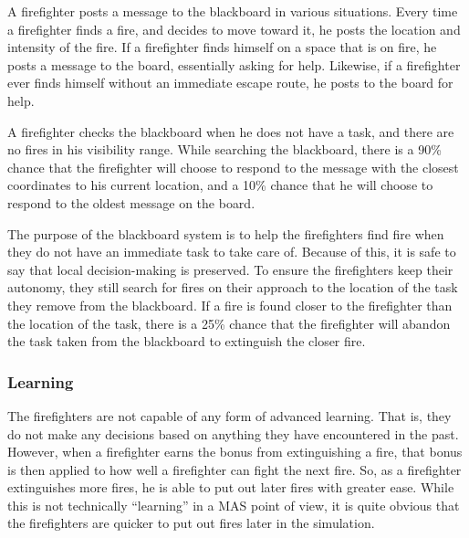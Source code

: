 \documentclass{article}
\begin{document}
  A firefighter posts a message to the blackboard in various situations.
  Every time a firefighter finds a fire, and decides to move toward it, he posts
  the location and intensity of the fire.  If a firefighter finds himself
  on a space that is on fire, he posts a message to the board, essentially
  asking for help.  Likewise, if a firefighter ever finds himself without an
  immediate escape route, he posts to the board for help.

  A firefighter checks the blackboard when he does not have a task, and there
  are no fires in his visibility range.  While searching the blackboard, there
  is a 90\% chance that the firefighter will choose to respond to the message
  with the closest coordinates to his current location, and a 10\% chance
  that he will choose to respond to the oldest message on the board.

  The purpose of the blackboard system is to help the firefighters find fire
  when they do not have an immediate task to take care of. Because of this,
  it is safe to say that local decision-making is preserved. To ensure the
  firefighters keep their autonomy, they still search for fires on their
  approach to the location of the task they remove from the blackboard. If
  a fire is found closer to the firefighter than the location of the task,
  there is a 25\% chance that the firefighter will abandon the task taken
  from the blackboard to extinguish the closer fire.

  \subsubsection*{Learning}
  The firefighters are not capable of any form of advanced learning.  That is,
  they do not make any decisions based on anything they have encountered in
  the past.  However, when a firefighter earns the bonus from extinguishing
  a fire, that bonus is then applied to how well a firefighter can fight the
  next fire.  So, as a firefighter extinguishes more fires, he is able to put
  out later fires with greater ease.  While this is not technically
  ``learning'' in a MAS point of view, it is quite obvious that the
  firefighters are quicker to put out fires later in the simulation.
\end{document}
